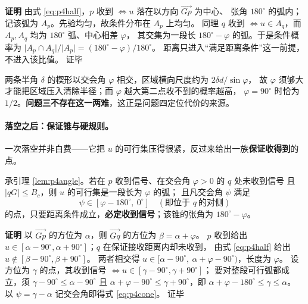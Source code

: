 \documentclass[withoutpreface, bwprint]{cumcmthesis}
\renewenvironment{proof}{\par\noindent\textbf{证明}\quad}{\hfill 证毕\par\medskip}
\begin{document}
\begin{proof}
由式 \eqref{eq:p4half}，$p$ 收到 $\iff u$ 落在以方向 $\overrightarrow{Gp}$ 为中心、
张角 $180^\circ$ 的弧内；记该弧为 $A_p$。先验均匀，故条件分布在 $A_p$ 上均匀。
同理 $q$ 收到 $\iff u\in A_q$，而 $A_p,A_q$ 均为 $180^\circ$ 弧、中心相差 $\varphi$，
其交集为一段长 $180^\circ-\varphi$ 的弧。于是条件概率为
$\lvert A_p\cap A_q\rvert/\lvert A_p\rvert=(180^\circ-\varphi)/180^\circ$。
距离只进入“满足距离条件”这一前提，不进入该比值。
\end{proof}

两条半角 $\delta$ 的楔形以交会角 $\varphi$ 相交，区域横向尺度约为 $2\delta d/\sin\varphi$，
故 $\varphi$ 须够大才能把区域压入清除半径；而 $\varphi$ 越大第二点收不到的概率越高，
$\varphi=90^\circ$ 时恰为 $1/2$。\textbf{问题三不存在这一两难}，这正是问题四定位代价的来源。

\paragraph{落空之后：保证锥与硬规则。}
一次落空并非白费——它把 $u$ 的可行集压得很紧，反过来给出一族\textbf{保证收得到}的点。

\begin{corollary}[保证锥]
\label{cor:p4cone}
承引理 \ref{lem:p4angle}。若在 $p$ 收到信号、在交会角 $\varphi>0$ 的 $q$ 处未收到信号
且 $\lvert qG\rvert\le B_c$，则 $u$ 的可行集是一段长为 $\varphi$ 的弧；
且凡交会角 $\psi$ 满足
\begin{equation}
  \label{eq:p4cone}
  \psi\in[\varphi-180^\circ,\ 0^\circ]\quad(\text{即位于 }q\ \text{的对侧})
\end{equation}
的点，只要距离条件成立，\textbf{必定收到信号}；该锥的张角为 $180^\circ-\varphi$。
\end{corollary}

\begin{proof}
以 $\overrightarrow{Gp}$ 的方位为 $\alpha$，则 $\overrightarrow{Gq}$ 的方位为 $\beta=\alpha+\varphi$。
$p$ 收到给出 $u\in[\alpha-90^\circ,\alpha+90^\circ]$；$q$ 在保证接收距离内却未收到，
由式 \eqref{eq:p4half} 给出 $u\notin[\beta-90^\circ,\beta+90^\circ]$。
两者相交得 $u\in[\alpha-90^\circ,\ \alpha+\varphi-90^\circ)$，长度为 $\varphi$。
设方位为 $\gamma$ 的点，其收到信号 $\iff u\in[\gamma-90^\circ,\gamma+90^\circ]$；
要对整段可行弧都成立，须 $\gamma-90^\circ\le\alpha-90^\circ$ 且
$\alpha+\varphi-90^\circ\le\gamma+90^\circ$，即 $\alpha+\varphi-180^\circ\le\gamma\le\alpha$。
以 $\psi=\gamma-\alpha$ 记交会角即得式 \eqref{eq:p4cone}。
\end{proof}
\end{document}
